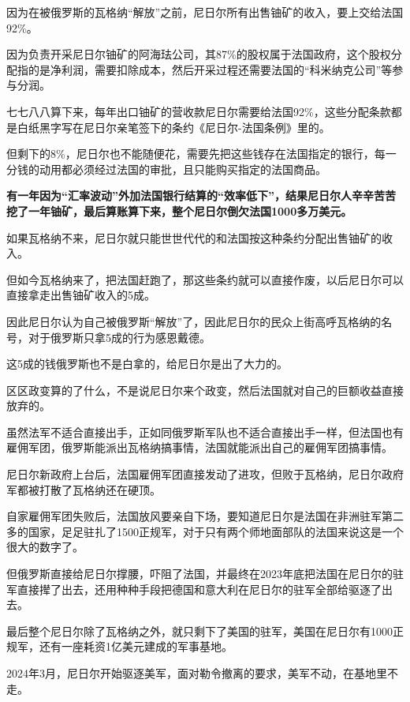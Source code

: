 \documentclass[UTF8, 11pt, oneside]{ctexart}
\newcommand{\zd}[1]{\textbf{\textcolor[RGB]{123,12,0}{#1}}} %
\begin{document}
因为在被俄罗斯的瓦格纳“解放”之前，尼日尔所有出售铀矿的收入，要上交给法国92\%。

因为负责开采尼日尔铀矿的阿海珐公司，其87\%的股权属于法国政府，这个股权分配指的是净利润，需要扣除成本，然后开采过程还需要法国的“科米纳克公司”等参与分润。

七七八八算下来，每年出口铀矿的营收款尼日尔需要给法国92\%，这些分配条款都是白纸黑字写在尼日尔亲笔签下的条约《尼日尔-法国条例》里的。

但剩下的8\%，尼日尔也不能随便花，需要先把这些钱存在法国指定的银行，每一分钱的动用都必须经过法国的审批，且只能购买指定的法国商品。

\zd{有一年因为“汇率波动”外加法国银行结算的“效率低下”，结果尼日尔人辛辛苦苦挖了一年铀矿，最后算账算下来，整个尼日尔倒欠法国1000多万美元。}

如果瓦格纳不来，尼日尔就只能世世代代的和法国按这种条约分配出售铀矿的收入。

但如今瓦格纳来了，把法国赶跑了，那这些条约就可以直接作废，以后尼日尔可以直接拿走出售铀矿收入的5成。

因此尼日尔认为自己被俄罗斯“解放”了，因此尼日尔的民众上街高呼瓦格纳的名号，对于俄罗斯只拿5成的行为感恩戴德。

这5成的钱俄罗斯也不是白拿的，给尼日尔是出了大力的。

区区政变算的了什么，不是说尼日尔来个政变，然后法国就对自己的巨额收益直接放弃的。

虽然法军不适合直接出手，正如同俄罗斯军队也不适合直接出手一样，但法国也有雇佣军团，俄罗斯能派出瓦格纳搞事情，法国就能派出自己的雇佣军团搞事情。

尼日尔新政府上台后，法国雇佣军团直接发动了进攻，但败于瓦格纳，尼日尔政府军都被打散了瓦格纳还在硬顶。

自家雇佣军团失败后，法国放风要亲自下场，要知道尼日尔是法国在非洲驻军第二多的国家，足足驻扎了1500正规军，对于只有两个师地面部队的法国来说这是一个很大的数字了。

但俄罗斯直接给尼日尔撑腰，吓阻了法国，并最终在2023年底把法国在尼日尔的驻军直接撵了出去，还用种种手段把德国和意大利在尼日尔的驻军全部给驱逐了出去。

最后整个尼日尔除了瓦格纳之外，就只剩下了美国的驻军，美国在尼日尔有1000正规军，还有一座耗资1亿美元建成的军事基地。

2024年3月，尼日尔开始驱逐美军，面对勒令撤离的要求，美军不动，在基地里不走。
\end{document}

